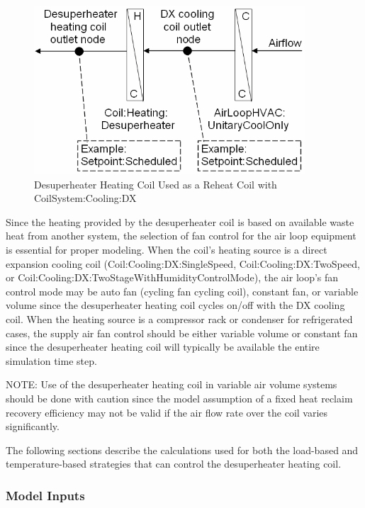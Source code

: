 \begin{figure}[hbtp] %
\centering
\includegraphics[width=0.9\textwidth, height=0.9\textheight, keepaspectratio=true]{media/image4016.png}
\caption{Desuperheater Heating Coil Used as a Reheat Coil with CoilSystem:Cooling:DX \protect \label{fig:desuperheater-heating-coil-used-as-a-reheat}}
\end{figure}

Since the heating provided by the desuperheater coil is based on available waste heat from another system, the selection of fan control for the air loop equipment is essential for proper modeling. When the coil's heating source is a direct expansion cooling coil (Coil:Cooling:DX:SingleSpeed, Coil:Cooling:DX:TwoSpeed, or Coil:Cooling:DX:TwoStageWithHumidityControlMode), the air loop's fan control mode may be auto fan (cycling fan cycling coil), constant fan, or variable volume since the desuperheater heating coil cycles on/off with the DX cooling coil. When the heating source is a compressor rack or condenser for refrigerated cases, the supply air fan control should be either variable volume or constant fan since the desuperheater heating coil will typically be available the entire simulation time step.

NOTE: Use of the desuperheater heating coil in variable air volume systems should be done with caution since the model assumption of a fixed heat reclaim recovery efficiency may not be valid if the air flow rate over the coil varies significantly.

The following sections describe the calculations used for both the load-based and temperature-based strategies that can control the desuperheater heating coil.

\subsubsection{Model Inputs}\label{model-inputs-4}

